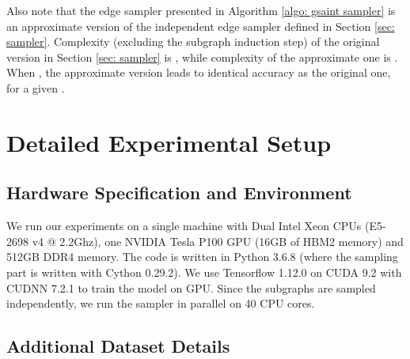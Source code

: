 \documentclass{article} \usepackage{iclr2020_conference,times}
\begin{document}
Also note that the edge sampler presented in Algorithm \ref{algo: gsaint sampler} is an approximate version of the independent edge sampler defined in Section \ref{sec: sampler}. 
Complexity (excluding the subgraph induction step) of the original version in Section \ref{sec: sampler} is , while  complexity of the approximate one is . 
When , the approximate version leads to identical accuracy as the original one, for a given . 

\section{Detailed Experimental Setup}

\subsection{Hardware Specification and Environment}
\label{appendix: hw}

We run our experiments on a single machine with Dual Intel Xeon CPUs (E5-2698 v4 @ 2.2Ghz), one NVIDIA Tesla P100 GPU (16GB of HBM2 memory) and 512GB DDR4 memory. The code is written in Python 3.6.8 (where the sampling part is written with Cython 0.29.2). We use Tensorflow 1.12.0 on CUDA 9.2 with CUDNN 7.2.1 to train the model on GPU. Since the subgraphs are sampled independently, we run the sampler in parallel on 40 CPU cores. 

\subsection{Additional Dataset Details}
\label{appendix: data}
\end{document}
